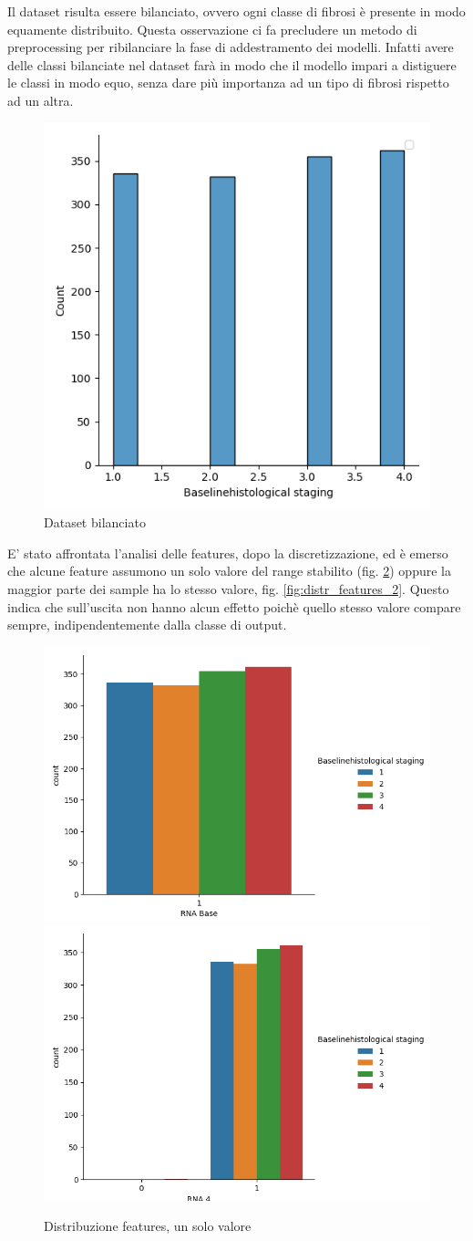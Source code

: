 Il dataset risulta essere bilanciato, ovvero ogni classe di fibrosi è presente in modo equamente distribuito. Questa osservazione ci fa precludere un metodo di preprocessing per ribilanciare la fase di addestramento dei modelli. Infatti avere delle classi bilanciate nel dataset farà in modo che il modello impari a distiguere le classi in modo equo, senza dare più importanza ad un tipo di fibrosi rispetto ad un altra.
\begin{figure}[H]
    \centering
    \includegraphics[width=0.5\columnwidth]{figures/target_label.png}
    \caption{Dataset bilanciato}
    \label{fig:target}
\end{figure}



E' stato affrontata l'analisi delle features, dopo la discretizzazione, ed è emerso che alcune feature assumono un solo valore del range stabilito (fig. \ref{fig:distr_features_1}) oppure la maggior parte dei sample ha lo stesso valore, fig. \ref{fig:distr_features_2}. Questo indica che sull'uscita non hanno alcun effetto poichè quello stesso valore compare sempre, indipendentemente dalla classe di output.

\begin{figure}[H]
    \centering
    \includegraphics[width=0.4\columnwidth]{figures/RNA base.png}\includegraphics[width=0.4\columnwidth]{figures/RNA 4.png}
    
    \caption{Distribuzione features, un solo valore}
    \label{fig:distr_features_1}
\end{figure}

